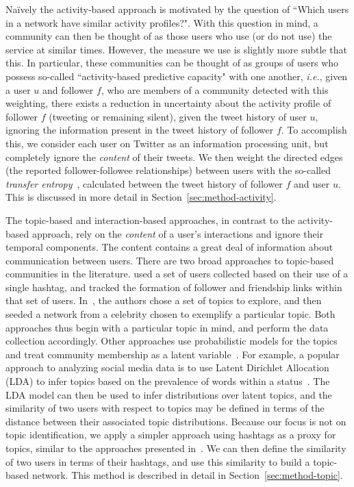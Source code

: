 Na\"ively the activity-based approach is motivated by the question of ``Which users in a network have similar activity profiles?".
 With this question in mind, a community can then be thought of as those users who use (or do not use) the service at similar times. However, the measure we use is slightly more subtle that this. In particular, these communities can be thought of as groups of users who possess so-called ``activity-based predictive capacity" with one another, \emph{i.e.}, given a user $u$ and follower $f$, who are members of a community detected with this weighting, there exists a reduction in uncertainty about the activity profile of follower $f$ (tweeting or remaining silent), given the tweet history of user $u$, ignoring the information present in the tweet history of follower $f$.  To accomplish this, we consider each user on Twitter as an information processing unit, but completely ignore the \emph{content} of their tweets. We then weight the directed edges (the reported follower-followee relationships) between users with the so-called \emph{transfer entropy}~\cite{schreiber2000measuring}, calculated between the tweet history of follower $f$ and user $u$. This is discussed in more detail in Section~\ref{sec:method-activity}.

The topic-based and interaction-based approaches, in contrast to the activity-based approach, rely on the \emph{content} of a user's interactions and ignore their temporal components. The content contains a great deal of information about communication between users.
There are two broad approaches to topic-based communities in the literature. \cite{rossi2012conversation} used a set of users collected based on their use of a single hashtag, and tracked the formation of follower and friendship links within that set of users. In~\cite{lim2012following}, the authors chose a set of topics to explore, and then seeded a network from a celebrity chosen to exemplify a particular topic. Both approaches thus begin with a particular topic in mind, and perform the data collection accordingly. Other approaches use probabilistic models for the topics and treat community membership as a latent variable~\cite{yin2012latent}.
For example, a popular approach to analyzing social media data is to use Latent Dirichlet Allocation (LDA) to infer topics based on the prevalence of words within a status~\cite{zhao2011comparing,michelson2010discovering}. The LDA model can then be used to infer distributions over latent topics, and the similarity of two users with respect to topics may be defined in terms of the distance between their associated topic distributions. Because our focus is not on topic identification, we apply a simpler approach using hashtags as a proxy for topics, similar to the approaches presented in~\cite{becker2011beyond,tsur2012s}. We can then define the similarity of two users in terms of their hashtags, and use this similarity to build a topic-based network. This method is described in detail in Section~\ref{sec:method-topic}.

